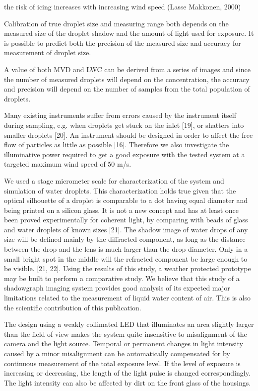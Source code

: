 the risk of icing increases with increasing wind speed (Lasse Makkonen, 2000)



Calibration of true droplet size and measuring range both depends on the measured size of the droplet shadow and the amount of light used for exposure. It is possible to predict both the precision of the measured size and accuracy for measurement of droplet size. 

A value of both MVD and LWC can be derived from a series of images and since the number of measured droplets will depend on the concentration, the accuracy and precision will depend on the number of samples from the total population of droplets. 

Many existing instruments suffer from errors caused by the instrument itself during sampling, e.g. when droplets get stuck on the inlet [19], or shatters into smaller droplets [20]. An instrument should be designed in order to affect the free flow of particles as little as possible [16]. Therefore we also investigate the illuminative power required to get a good exposure with the tested system at a targeted maximum wind speed of 50 m/s.

We used a stage micrometer scale for characterization of the system and simulation of water droplets. This characterization holds true given that the optical silhouette of a droplet is comparable to a dot having equal diameter and being printed on a silicon glass. It is not a new concept and has at least once been proved experimentally for coherent light, by comparing with beads of glass and water droplets of known sizes [21]. The shadow image of water drops of any size will be defined mainly by the diffracted component, as long as the distance between the drop and the lens is much larger than the drop diameter. Only in a small bright spot in the middle will the refracted component be large enough to be visible. [21, 22]. 
Using the results of this study, a weather protected prototype may be built to perform a comparative study.
We believe that this study of a shadowgraph imaging system provides good analysis of its expected major limitations related to the measurement of liquid water content of air. This is also the scientific contribution of this publication. 


The design using a weakly collimated LED that illuminates an area slightly larger than the field of view makes the system quite insensitive to misalignment of the camera and the light source. Temporal or permanent changes in light intensity caused by a minor misalignment can be automatically compensated for by continuous measurement of the total exposure level. If the level of exposure is increasing or decreasing, the length of the light pulse is changed correspondingly. The light intensity can also be affected by dirt on the front glass of the housings. 

